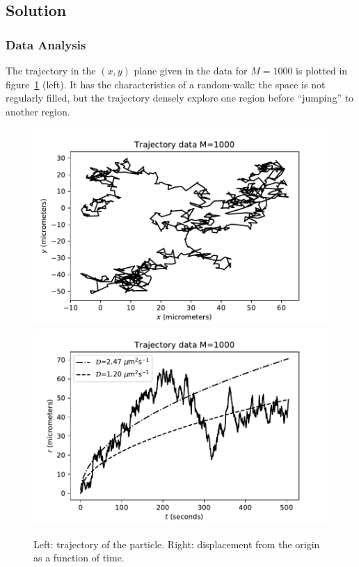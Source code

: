 \documentclass{article}
\begin{document}

\noindent

\subsection*{Solution}

\subsubsection*{Data Analysis}

The trajectory in the $(x,y)$ plane given in the data for $M=1000$ is plotted in figure~\ref{trag} (left). It has the characteristics of a random-walk: the space is not regularly filled, 
but  the trajectory densely explore one region before ``jumping'' to another region.

\begin{figure}[h]
\centering
\includegraphics[width=.49\textwidth]{Figs1/trajectory_dataM1000d2_5.pdf}
\includegraphics[width=.49\textwidth]{Figs1/rvst_dataM1000d2_5.pdf}
\caption{Left: trajectory of the particle. Right: displacement  from the origin as a function of time.}
\label{trag}
\end{figure}
 
\end{document}
